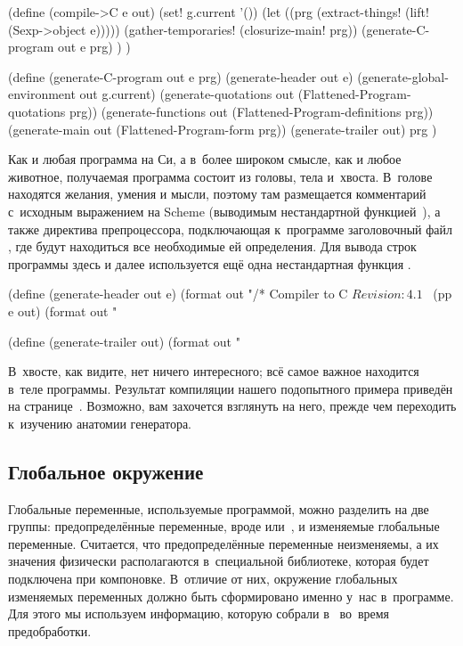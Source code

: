 \begin{code:lisp}
(define (compile->C e out)
  (set! g.current '())
  (let ((prg (extract-things! (lift! (Sexp->object e)))))
    (gather-temporaries! (closurize-main! prg))
    (generate-C-program out e prg) ) )

(define (generate-C-program out e prg)
  (generate-header             out e)
  (generate-global-environment out g.current)
  (generate-quotations         out (Flattened-Program-quotations prg))
  (generate-functions          out (Flattened-Program-definitions prg))
  (generate-main               out (Flattened-Program-form prg))
  (generate-trailer            out)
  prg )
\end{code:lisp}

Как и любая программа на Си, а в~более широком смысле, как и любое животное,
получаемая программа состоит из головы, тела и~хвоста. В~голове находятся
желания, умения и мысли, поэтому там размещается комментарий с~исходным
выражением на Scheme (выводимым нестандартной функцией~), а также
директива препроцессора, подключающая к~программе заголовочный файл
, где будут находиться все необходимые ей определения. Для вывода
строк программы здесь и далее используется ещё одна нестандартная функция
.

\begin{code:lisp}
(define (generate-header out e)
  (format out "/* Compiler to C $Revision: 4.1$~%
  (pp e out)
  (format out "~%

(define (generate-trailer out)
  (format out "~%
\end{code:lisp}

В~хвосте, как видите, нет ничего интересного; всё самое важное находится в~теле
программы. Результат компиляции нашего подопытного примера приведён на
странице~\pageref{cc/gen/init/src:result}. Возможно, вам захочется взглянуть на
него, прежде чем переходить к~изучению анатомии генератора.


\subsection{Глобальное окружение}\label{cc/gen/ssect:global}

Глобальные переменные, используемые программой, можно разделить на две группы:
предопределённые переменные, вроде  или~\ic{+}, и изменяемые глобальные
переменные. Считается, что предопределённые переменные неизменяемы, а их
значения физически располагаются в~специальной библиотеке, которая будет
подключена при компоновке. В~отличие от них, окружение глобальных изменяемых
переменных должно быть сформировано именно у~нас в~программе. Для этого мы
используем информацию, которую собрали в~ во~время предобработки.

